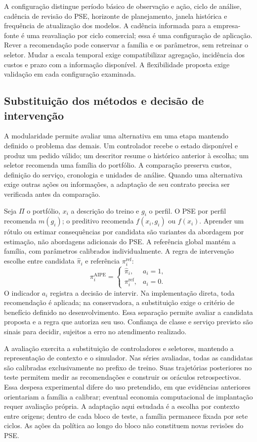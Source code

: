 \documentclass[preprint,12pt]{elsarticle}
\begin{document}
A configuração distingue período básico de observação e ação, ciclo de análise, cadência de revisão do PSE, horizonte de planejamento, janela histórica e frequência de atualização dos modelos. A cadência informada para a empresa-fonte é uma reavaliação por ciclo comercial; essa é uma configuração de aplicação. Rever a recomendação pode conservar a família e os parâmetros, sem retreinar o seletor. Mudar a escala temporal exige compatibilizar agregação, incidência dos custos e prazo com a informação disponível. A flexibilidade proposta exige validação em cada configuração examinada.

\subsection{Substituição dos métodos e decisão de intervenção}
A modularidade permite avaliar uma alternativa em uma etapa mantendo definido o problema das demais. Um controlador recebe o estado disponível e produz um pedido válido; um descritor resume o histórico anterior à escolha; um seletor recomenda uma família do portfólio. A comparação preserva custos, definição do serviço, cronologia e unidades de análise. Quando uma alternativa exige outras ações ou informações, a adaptação de seu contrato precisa ser verificada antes da comparação.

Seja $\Pi$ o portfólio, $x_i$ a descrição do treino e $g_i$ o perfil. O PSE por perfil recomenda $m(g_i)$; o preditivo recomenda $f(x_i,g_i)$ ou $f(x_i)$. Aprender um rótulo ou estimar consequências por candidata são variantes da abordagem por estimação, não abordagens adicionais do PSE. A referência global mantém a família, com parâmetros calibrados individualmente. A regra de intervenção escolhe entre candidata $\widehat\pi_i$ e referência $\pi_i^{\mathrm{ref}}$:
\[
 \pi_i^{\mathrm{AIPE}}=
 \begin{cases}\widehat\pi_i,&a_i=1,\\\pi_i^{\mathrm{ref}},&a_i=0.\end{cases}
\]
O indicador $a_i$ registra a decisão de intervir. Na implementação direta, toda recomendação é aplicada; na conservadora, a substituição exige o critério de benefício definido no desenvolvimento. Essa separação permite avaliar a candidata proposta e a regra que autoriza seu uso. Confiança de classe e serviço previsto são sinais para decidir, sujeitos a erro no atendimento realizado.

A avaliação exercita a substituição de controladores e seletores, mantendo a representação de contexto e o simulador. Nas séries avaliadas, todas as candidatas são calibradas exclusivamente no prefixo de treino. Suas trajetórias posteriores no teste permitem medir as recomendações e construir os oráculos retrospectivos. Essa despesa experimental difere do uso pretendido, em que evidências anteriores orientariam a família a calibrar; eventual economia computacional de implantação requer avaliação própria. A adaptação aqui estudada é a escolha por contexto entre origens; dentro de cada bloco de teste, a família permanece fixada por sete ciclos. As ações da política ao longo do bloco não constituem novas revisões do PSE.
\end{document}
